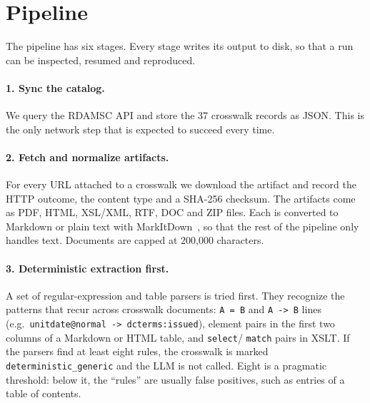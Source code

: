 \documentclass[10pt,twocolumn,a4paper]{extarticle}
\begin{document}
\section{Pipeline}\label{sec:method}

The pipeline has six stages. Every stage writes its output to
disk, so that a run can be inspected, resumed and reproduced.

\paragraph{1. Sync the catalog.} We query the RDAMSC API and store the 37
crosswalk records as JSON.
This is the
only network step that is expected to succeed every time.

\paragraph{2. Fetch and normalize artifacts.} For every URL attached to a
crosswalk we download the artifact and record the HTTP outcome, the content
type and a SHA-256 checksum. The artifacts come as PDF, HTML, XSL/XML,
RTF, DOC and ZIP files. Each is converted to Markdown or plain text with
MarkItDown~\cite{markitdown}, so that the rest of the pipeline only handles
text. Documents are capped at 200,000 characters.

\paragraph{3. Deterministic extraction first.} A set of regular-expression
and table parsers is tried first. They recognize the patterns
that recur across crosswalk documents: \texttt{A = B} and \texttt{A -> B}
lines (e.g.\ \texttt{unitdate@normal -> dcterms:issued}), element pairs in the
first two columns of a Markdown or HTML table, and \texttt{select}/
\texttt{match} pairs in XSLT. If the parsers find at least eight rules, the
crosswalk is marked \texttt{deterministic\_generic} and the LLM is not
called. Eight is a pragmatic threshold: below it, the ``rules'' are usually
false positives, such as entries of a table of contents.
\end{document}
